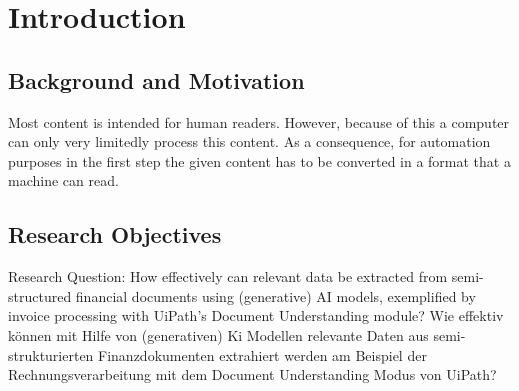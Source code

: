 \chapter{Introduction}

\section{Background and Motivation}

Most content is intended for human readers. However, because of this a computer can only very limitedly process this content. As a consequence, for automation purposes in the first step the given content has to be converted in a format that a machine can read.
\section{Research Objectives}
Research Question:  
How effectively can relevant data be extracted from semi-structured financial documents using (generative) AI models, exemplified by invoice processing with UiPath's Document Understanding module?
Wie effektiv können mit Hilfe von (generativen) Ki Modellen relevante Daten aus semi-strukturierten Finanzdokumenten extrahiert werden am Beispiel der Rechnungsverarbeitung mit dem Document Understanding Modus von UiPath?